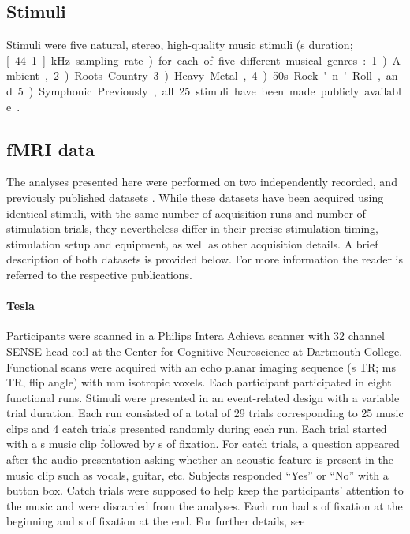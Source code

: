 \subsection*{Stimuli}

Stimuli were five natural, stereo, high-quality music stimuli (\unit[6]{s} duration; \unit[44.1]{kHz} sampling rate) for each of five different musical genres: 1) Ambient, 2) Roots Country 3) Heavy Metal, 4) 50s Rock'n'Roll, and 5) Symphonic. Previously, all 25 stimuli have been made publicly available \citep{HDH+2015}.

\subsection*{f{MRI} data}

The analyses presented here were performed on two independently recorded, and previously published datasets \citep{CTK+2012,HDH+2015}. While these datasets have been acquired using identical stimuli, with the same number of acquisition runs and number of stimulation trials, they nevertheless differ in their precise stimulation timing, stimulation setup and equipment, as well as other acquisition details. A brief description of both datasets is provided below. For more information the reader is referred to the respective publications.

\paragraph{\unit[3]{Tesla}}
%
Participants were scanned in a Philips Intera Achieva scanner with 32 channel SENSE head coil at the Center for Cognitive Neuroscience at Dartmouth College. Functional scans were acquired with an echo planar imaging sequence (\unit[2]{s} TR; \unit[35]{ms} TR, \unit[90]{\textdegree} flip angle) with \unit[3]{mm} isotropic voxels.
Each participant participated in eight functional runs. Stimuli were presented in an event-related design with a variable trial duration. Each run consisted of a total of 29 trials corresponding to 25 music clips and 4 catch trials presented randomly during each run. Each trial started with a \unit[6]{s} music clip followed by \unit[4-8]{s} of fixation. For catch trials, a question appeared after the audio presentation asking whether an acoustic feature is present in the music clip such as vocals, guitar, etc. Subjects responded “Yes” or “No” with a button box. Catch trials were supposed to help keep the participants’ attention to the music and were discarded from the analyses. Each run had \unit[4]{s} of fixation at the beginning and \unit[10]{s} of fixation at the end. For further details, see \citet{CTK+2012}

